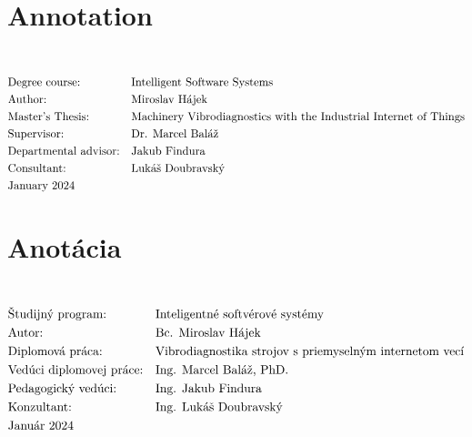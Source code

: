 \thispagestyle{empty}
\section*{Annotation}
\UniversityEN \\
\uppercase{\FacultyEN}
\vspace{-8pt}
{\setlength{\mathindent}{0cm}
\begin{align*}
&\text{Degree course:} && \text{\StudyProgrammeEN} \\
&\text{Author:} && \text{\AuthorEN} \\
&\text{\ThesisEN:} && \text{\TitleEN} \\
&\text{Supervisor:} && \text{\SupervisorEN} \\
&\text{Departmental advisor:} && \text{\DepartmentalAdvisorEN} \\
&\text{Consultant:} && \text{\ConsultantEN} \\
&\text{\DateEN}
\end{align*}}

\emptypage 

\thispagestyle{empty}
\section*{Anotácia}
\University \\
\uppercase{\Faculty}
\vspace{-8pt}
{\setlength{\mathindent}{0cm}
\begin{align*}
&\text{Študijný program:} && \text{\StudyProgramme} \\
&\text{Autor:} && \text{\Author} \\
&\text{\Thesis:} && \text{\Title} \\
&\text{Vedúci diplomovej práce:} && \text{\Supervisor} \\
&\text{Pedagogický vedúci:} && \text{\DepartmentalAdvisor} \\
&\text{Konzultant:} && \text{\Consultant} \\
&\text{\Date}
\end{align*}}

\emptypage